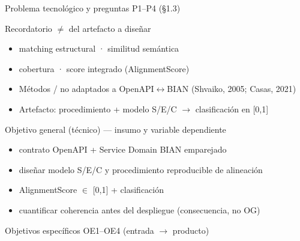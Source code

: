 \documentclass[aspectratio=169,11pt,spanish]{beamer}
\begin{document}
\begin{frame}{Problema tecnológico y preguntas P1--P4 (§1.3)}
  \begin{planreminder}{Recordatorio}
     $\neq$  del artefacto a diseñar
  \end{planreminder}
  \vspace{0.15em}
  \begin{planpanel}
  \begin{itemize}
    \item {} matching estructural ·  similitud semántica
    \item {} cobertura ·  score integrado (AlignmentScore)
    \item Métodos  / no adaptados a OpenAPI$\leftrightarrow$BIAN (Shvaiko, 2005; Casas, 2021)
    \item Artefacto: procedimiento + modelo S/E/C $\rightarrow$ clasificación en [0,1]
  \end{itemize}
  \end{planpanel}
\end{frame}

\begin{frame}{Objetivo general (técnico) --- insumo y variable dependiente}
  \begin{planpanel}
  \begin{itemize}
    \item {} contrato OpenAPI + Service Domain BIAN emparejado
    \item {} diseñar modelo S/E/C y procedimiento reproducible de alineación
    \item {} AlignmentScore $\in$ [0,1] + clasificación
    \item {} cuantificar coherencia antes del despliegue (consecuencia, no OG)
  \end{itemize}
  \end{planpanel}
\end{frame}

\begin{frame}{Objetivos específicos OE1--OE4 (entrada $\rightarrow$ producto)}
\end{frame}
\end{document}
